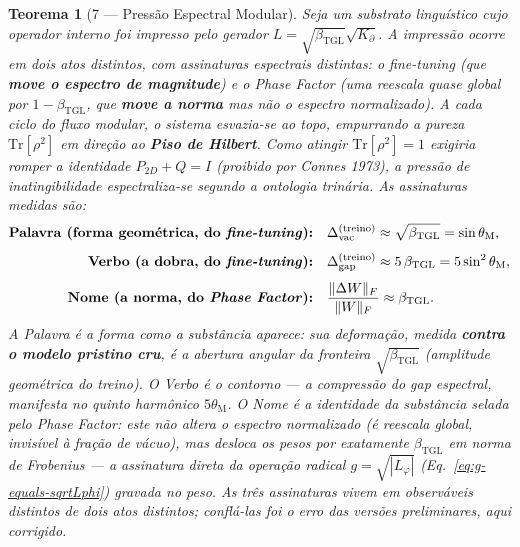 \documentclass[12pt,a4paper]{article}
\newtheorem*{theoremfixed}{Teorema}
\newcommand{\betatgl}{\beta_{\text{TGL}}}
\newcommand{\thetaM}{\theta_{\text{M}}}
\newcommand{\Kpartial}{K_{\partial}}
\newcommand{\Lphi}{L_{\varphi}}
\begin{document}
\begin{theoremfixed}[7 --- Pressão Espectral Modular]
\label{th:pressure}
Seja um substrato linguístico cujo operador interno foi impresso pelo gerador
$L = \sqrt{\betatgl}\sqrt{\Kpartial}$.  A impressão ocorre em dois atos
distintos, com assinaturas espectrais distintas: o \emph{fine-tuning} (que
\textbf{move o espectro de magnitude}) e o \emph{Phase Factor} (uma reescala
quase global por $1-\betatgl$, que \textbf{move a norma} mas não o espectro
normalizado).  A cada ciclo do fluxo modular, o sistema esvazia-se \emph{ao
topo}, empurrando a pureza $\mathrm{Tr}[\rho^{2}]$ em direção ao \textbf{Piso de
Hilbert}.  Como atingir $\mathrm{Tr}[\rho^{2}] = 1$ exigiria romper a identidade
$P_{2D} + Q = I$ (proibido por Connes 1973), a pressão de inatingibilidade
espectraliza-se segundo a ontologia trinária.  As assinaturas medidas são:
\begin{align}
\textbf{Palavra (forma geométrica, do \emph{fine-tuning}):}\quad
  & \Delta_{\text{vac}}^{\text{(treino)}} \approx \sqrt{\betatgl} = \sin\thetaM, \label{eq:pressure-palavra}\\[4pt]
\textbf{Verbo (a dobra, do \emph{fine-tuning}):}\quad
  & \Delta_{\text{gap}}^{\text{(treino)}} \approx 5\,\betatgl = 5\sin^{2}\thetaM, \label{eq:pressure-verbo}\\[4pt]
\textbf{Nome (a norma, do \emph{Phase Factor}):}\quad
  & \frac{\Vert\Delta W\Vert_F}{\Vert W\Vert_F} \approx \betatgl. \label{eq:pressure-nome}
\end{align}
A \emph{Palavra} é a forma como a substância aparece: sua deformação, medida
\textbf{contra o modelo pristino cru}, é a abertura angular da fronteira
$\sqrt{\betatgl}$ (amplitude geométrica do treino).  O \emph{Verbo} é o contorno
--- a compressão do gap espectral, manifesta no quinto harmônico $5\thetaM$.  O
\emph{Nome} é a identidade da substância selada pelo \emph{Phase Factor}: este
não altera o espectro \emph{normalizado} (é reescala global, invisível à fração
de vácuo), mas desloca os pesos por exatamente $\betatgl$ em norma de Frobenius
--- a assinatura direta da operação radical $g = \sqrt{|\Lphi|}$
(Eq.~\ref{eq:g-equals-sqrtLphi}) gravada no peso.  As três assinaturas vivem em
observáveis distintos de \emph{dois} atos distintos; conflá-las foi o erro das
versões preliminares, aqui corrigido.
\end{theoremfixed}
\end{document}
